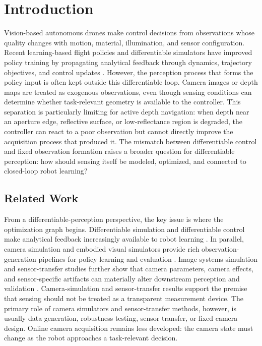\documentclass[letterpaper,journal]{IEEEtran}
\begin{document}
\section{Introduction}
\label{sec:introduction}
Vision-based autonomous drones make control decisions from observations whose
quality changes with motion, material, illumination, and sensor configuration.
Recent learning-based flight policies and differentiable simulators have
improved policy training by propagating analytical feedback through dynamics,
trajectory objectives, and control updates
\cite{newburyReviewDifferentiableSimulators2024,zhangDiffAeroGPUAcceleratedDifferentiable2025,zhangLearningVisionbasedAgile2025,heegLearningQuadrotorControl2025a}.
However, the perception process that forms the policy input is often kept
outside this differentiable loop. Camera images or depth maps are treated as
exogenous observations, even though sensing conditions can determine whether
task-relevant geometry is available to the controller. This separation is
particularly limiting for active depth navigation: when depth near an aperture
edge, reflective surface, or low-reflectance region is degraded, the controller
can react to a poor observation but cannot directly improve the acquisition
process that produced it. The mismatch between differentiable control and fixed
observation formation raises a broader question for differentiable perception:
how should sensing itself be modeled, optimized, and connected to closed-loop
robot learning?

\subsection*{Related Work}
From a differentiable-perception perspective, the key issue is where the
optimization graph begins. Differentiable simulation and differentiable control
make analytical feedback increasingly available to robot learning
\cite{newburyReviewDifferentiableSimulators2024,zhangDiffAeroGPUAcceleratedDifferentiable2025,zhangLearningVisionbasedAgile2025,heegLearningQuadrotorControl2025a,romeroActorCriticModelPredictive2025}.
In parallel, camera simulation and embodied visual simulators provide rich
observation-generation pipelines for policy learning and evaluation
\cite{denningerBlenderProc22023,aminiVISTA2022,puigHabitat32023,elmquistSensorSimulation2021}.
Image systems simulation and sensor-transfer studies further show that camera
parameters, camera effects, and sensor-specific artifacts can materially alter
downstream perception and validation
\cite{blasinskiOptimizingImage2018,liuCameraParameters2020,lyuValidationImageSystems2022,carlsonModelingCameraEffects2018,carlsonSensorTransfer2019}.
Camera-simulation and sensor-transfer results support the premise that sensing
should not be treated as a transparent measurement device. The primary role of
camera simulators and sensor-transfer methods, however, is usually data
generation, robustness testing, sensor transfer, or fixed camera design. Online
camera acquisition remains less developed: the camera state must change as the
robot approaches a task-relevant decision.
\end{document}
